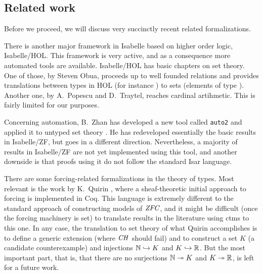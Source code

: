 \subsection{Related work}\label{sec:related-work}
Before we proceed, we will discuss very succinctly recent related
formalizations.

There is another major framework in Isabelle based on higher order
logic, Isabelle/HOL. This framework is very active, and as a 
consequence more automated tools are available. Isabelle/HOL has 
basic chapters on set theory. One of those, by Steven Obua, proceeds up to
well founded relations and provides translations between types in HOL
(for instance ) to  sets  (elements of type
). Another one, by A.~Popescu and D.~Traytel, reaches
cardinal artihmetic. This is fairly limited for our purposes.

Concerning automation, B.~Zhan has developed a new tool called
\texttt{auto2} and applied it to untyped set theory
\cite{10.1007/978-3-319-66107-0_32}. He has redeveloped essentially
the basic results in Isabelle/ZF, but goes in a different
direction. Nevertheless, a majority of results in
Isabelle/ZF are not yet implemented using this tool, and  another
downside is that proofs using it do not follow the standard Isar
language.

There are some forcing-related formalizations in the theory
of types. Most relevant is the work by K.~Quirin \cite{Quirin}, where
a sheaf-theoretic initial approach to forcing is implemented in
Coq. This language is extremely different to the standard approach of
constructing models of $\mathit{ZFC}$, and it might be difficult (once the
forcing machinery is set) to translate results in the literature using
ctms to this one. In any case, the translation to set theory of what
Quirin accomplishes is to define a generic extension (where $\mathit{CH}$
should fail) and to construct a set $K$ (a candidate counterexample)
and injections $\mathbb{N}\hookrightarrow K$ and $K\hookrightarrow\mathbb{R}$. But the
most important part, that is, that there are no surjections 
$\mathbb{N}\twoheadrightarrow K$ and $K\twoheadrightarrow\mathbb{R}$, is left for a future
work. %


